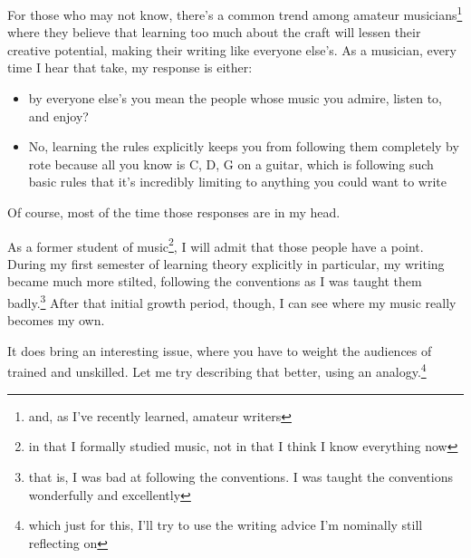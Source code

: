 \documentclass[12pt]{article}[titlepage]
\newcommand{\1}{\={a}}
\newcommand{\2}{\={e}}
\newcommand{\3}{\={\i}}
\newcommand{\4}{\=o}
\newcommand{\5}{\=u}
\newcommand{\6}{\={A}}
\renewcommand{\,}{\textsuperscript{,}}
\begin{document}
For those who may not know, there's a common trend among amateur musicians\footnote{and, as I've recently learned, amateur writers} where they believe that learning too much about the craft will lessen their creative potential, making their writing like everyone else's.
As a musician, every time I hear that take, my response is either:
\begin{itemize}
\item by everyone else's you mean the people whose music you admire, listen to, and enjoy?
\item No, learning the rules explicitly keeps you from following them completely by rote because all you know is C, D, G on a guitar, which is following such basic rules that it's incredibly limiting to anything you could want to write
\end{itemize}
Of course, most of the time those responses are in my head.

As a former student of music\footnote{in that I formally studied music, not in that I think I know everything now}, I will admit that those people have a point.
During my first semester of learning theory explicitly in particular, my writing became much more stilted, following the conventions as I was taught them badly.\footnote{that is, I was bad at following the conventions. I was taught the conventions wonderfully and excellently}
After that initial growth period, though, I can see where my music really becomes my own.

It does bring an interesting issue, where you have to weight the audiences of trained and unskilled.
Let me try describing that better, using an analogy.\footnote{which just for this, I'll try to use the writing advice I'm nominally still reflecting on}
\end{document}
